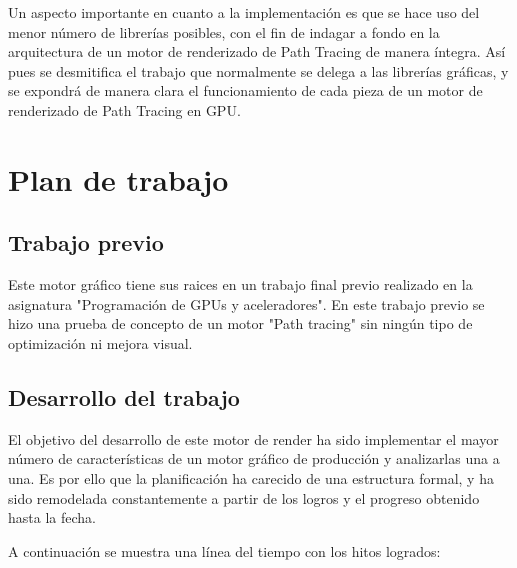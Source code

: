 Un aspecto importante en cuanto a la implementación es que se hace uso del menor número de librerías posibles, con el fin de indagar a fondo en la arquitectura de un motor de renderizado de Path Tracing de manera íntegra. Así pues se desmitifica el trabajo que normalmente se delega a las librerías gráficas, y se expondrá de manera clara el funcionamiento de cada pieza de un motor de renderizado de Path Tracing en GPU.


\section{Plan de trabajo}
	
\subsection{Trabajo previo}

Este motor gráfico tiene sus raices en un trabajo final previo realizado en la asignatura "Programación de GPUs y aceleradores". En este trabajo previo se hizo una prueba de concepto de un motor "Path tracing" sin ningún tipo de optimización ni mejora visual. 
	
\subsection{Desarrollo del trabajo}
	
El objetivo del desarrollo de este motor de render ha sido implementar el mayor número de características de un motor gráfico de producción y analizarlas una a una. Es por ello que la planificación ha carecido de una estructura formal, y ha sido remodelada constantemente a partir de los logros y el progreso obtenido hasta la fecha.



A continuación se muestra una línea del tiempo con los hitos logrados:	


